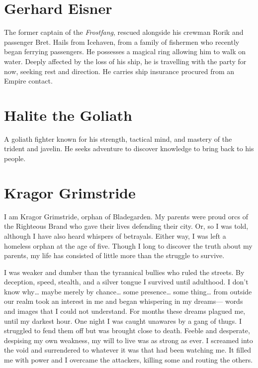 \documentclass[
  letterpaper,12pt,twoside,twocolumn,openany,
  nodeprecatedcode,bg=full]{dndbook}
\begin{document}
\chapter{Gerhard Eisner}\label{gerhard-eisner}

The former captain of the \emph{Frostfang}, rescued alongside his
crewman Rorik and passenger Bret. Hails from Icehaven, from a family of
fishermen who recently began ferrying passengers. He possesses a magical
ring allowing him to walk on water. Deeply affected by the loss of his
ship, he is travelling with the party for now, seeking rest and
direction. He carries ship insurance procured from an Empire contact.

\chapter{Halite the Goliath}\label{halite-the-goliath}

A goliath fighter known for his strength, tactical mind, and mastery of
the trident and javelin. He seeks adventure to discover knowledge to
bring back to his people.

\chapter{Kragor Grimstride}\label{kragor-grimstride}

I am Kragor Grimstride, orphan of Bladegarden. My parents were proud
orcs of the Righteous Brand who gave their lives defending their city.
Or, so I was told, although I have also heard whispers of betrayals.
Either way, I was left a homeless orphan at the age of five. Though I
long to discover the truth about my parents, my life has consisted of
little more than the struggle to survive.

I was weaker and dumber than the tyrannical bullies who ruled the
streets. By deception, speed, stealth, and a silver tongue I survived
until adulthood. I don't know why\ldots{} maybe merely by chance\ldots{}
some presence\ldots{} some thing\ldots{} from outside our realm took an
interest in me and began whispering in my dreams--- words and images
that I could not understand. For months these dreams plagued me, until
my darkest hour. One night I was caught unawares by a gang of thugs. I
struggled to fend them off but was brought close to death. Feeble and
desperate, despising my own weakness, my will to live was as strong as
ever. I screamed into the void and surrendered to whatever it was that
had been watching me. It filled me with power and I overcame the
attackers, killing some and routing the others.
\end{document}
